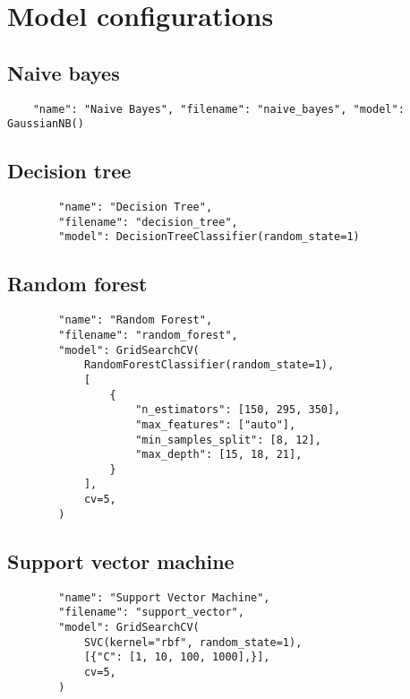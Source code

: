 
\chapter{Model configurations}
\label{appendix:model_configurations}

\section{Naive bayes}
\begin{verbatim}
    "name": "Naive Bayes", "filename": "naive_bayes", "model": GaussianNB()
\end{verbatim}

\section{Decision tree}
\begin{verbatim}
        "name": "Decision Tree",
        "filename": "decision_tree",
        "model": DecisionTreeClassifier(random_state=1)

\end{verbatim}

\section{Random forest}
\begin{verbatim}
        "name": "Random Forest",
        "filename": "random_forest",
        "model": GridSearchCV(
            RandomForestClassifier(random_state=1),
            [
                {
                    "n_estimators": [150, 295, 350],
                    "max_features": ["auto"],
                    "min_samples_split": [8, 12],
                    "max_depth": [15, 18, 21],
                }
            ],
            cv=5,
        )
\end{verbatim}

\section{Support vector machine}
\begin{verbatim}
        "name": "Support Vector Machine",
        "filename": "support_vector",
        "model": GridSearchCV(
            SVC(kernel="rbf", random_state=1),
            [{"C": [1, 10, 100, 1000],}],
            cv=5,
        )
\end{verbatim}

